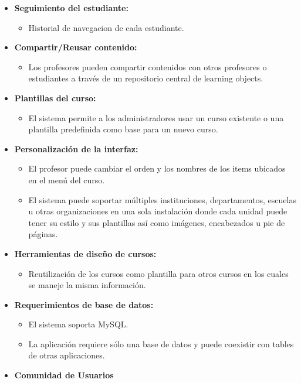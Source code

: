 	\begin{itemize}
		\item \textbf{Seguimiento del estudiante:}
			\begin{itemize}
				\item Historial de navegacion de cada estudiante.
			\end{itemize}
	\end{itemize}
	\begin{itemize}
		\item \textbf{Compartir/Reusar contenido:}
			\begin{itemize}
				\item Los profesores pueden compartir contenidos con otros profesores o estudiantes a través de un repositorio central de learning objects.
			\end{itemize}
	\end{itemize}
	\begin{itemize}
		\item \textbf{Plantillas del curso:}
			\begin{itemize}
				\item El sistema permite a los administradores usar un curso existente o una plantilla predefinida como base para un nuevo curso.
			\end{itemize}
	\end{itemize}
	\begin{itemize}
		\item \textbf{Personalización de la interfaz:}
			\begin{itemize}
				\item El profesor puede cambiar el orden y los nombres de los items ubicados en el menú del curso.
				\item El sistema puede soportar múltiples instituciones, departamentos, escuelas u otras organizaciones en una sola instalación donde cada unidad puede tener su estilo y sus plantillas así como imágenes, encabezados u pie de páginas.
			\end{itemize}
	\end{itemize}
	\begin{itemize}
		\item \textbf{Herramientas de diseño de cursos:}
			\begin{itemize}
				\item Reutilización de los cursos como plantilla para otros cursos en los cuales se maneje la misma información.
			\end{itemize}
	\end{itemize}
	\begin{itemize}
		\item \textbf{Requerimientos de base de datos:}
			\begin{itemize}
				\item El sistema soporta MySQL.
				\item La aplicación requiere sólo una base de datos y puede coexistir con tables de otras aplicaciones.
			\end{itemize}
	\end{itemize}
	\begin{itemize}
		\item \textbf{Comunidad de Usuarios}
	\end{itemize}
	

